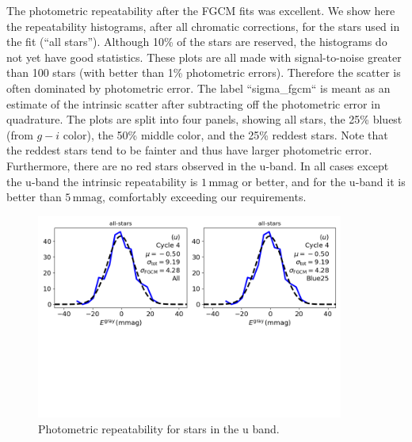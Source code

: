The photometric repeatability after the FGCM fits was excellent. We show here
the repeatability histograms, after all chromatic corrections, for the stars
used in the fit (``all stars'').  Although 10\% of the stars are reserved,
the histograms do not yet have good statistics.  These plots are all made with
signal-to-noise greater than 100 stars (with better than 1\% photometric
errors).  Therefore the scatter is often dominated by photometric error.  The
label ``sigma\_fgcm`` is meant as an estimate of the intrinsic scatter after
subtracting off the photometric error in quadrature. The plots are split into
four panels, showing all stars, the 25\% bluest (from $g-i$ color), the 50\%
middle color, and the 25\% reddest stars. Note that the reddest stars tend to
be fainter and thus have larger photometric error. Furthermore, there are no
red stars observed in the u-band. In all cases except the u-band the intrinsic
repeatability is $1\,\mathrm{mmag}$ or better, and for the u-band it is better
than $5\,\mathrm{mmag}$, comfortably exceeding our requirements.

\begin{figure}
  \begin{center}
    \includegraphics[width=0.9\textwidth]{photometric_calibration_figures/repeatability_u.png}
  \end{center}
  \caption{Photometric repeatability for stars in the u band.}
\end{figure}

